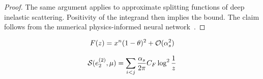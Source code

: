 \begin{proof}
The same argument applies to approximate splitting functions of deep
inelastic scattering. Positivity of the integrand then implies the
bound. The claim follows from the numerical physics-informed neural
network~\cite{TPC:2466-Gauge-Covariant-Bump-Hunting-with-Point-Cloud-Transformers-and-Canonical-Differential-Equations-September-29-2026}.
\end{proof}

\begin{equation}
  F(z) = {x}^{n} (1 - \theta)^{2} + \mathcal{O}(\alpha_s^{2})
  \label{eq:2}
\end{equation}

\begin{equation}
  \mathcal{S}(e_2^{(2)}, \mu) = \sum_{i<j} \frac{\alpha_s}{2\pi} C_F \log^{2} \frac{1}{z}
  \label{eq:3}
\end{equation}

